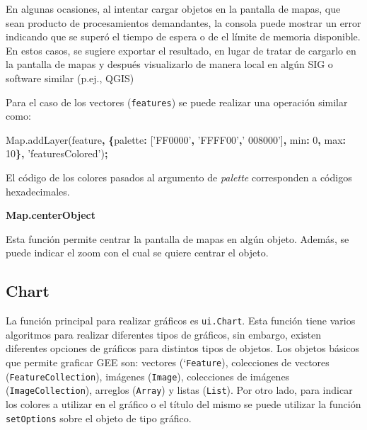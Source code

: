 \documentclass[
]{article}
\newenvironment{Shaded}{\begin{snugshade}}{\end{snugshade}}
\newcommand{\AttributeTok}[1]{\textcolor[rgb]{0.77,0.63,0.00}{#1}}
\newcommand{\DataTypeTok}[1]{\textcolor[rgb]{0.13,0.29,0.53}{#1}}
\newcommand{\DecValTok}[1]{\textcolor[rgb]{0.00,0.00,0.81}{#1}}
\newcommand{\NormalTok}[1]{#1}
\newcommand{\OperatorTok}[1]{\textcolor[rgb]{0.81,0.36,0.00}{\textbf{#1}}}
\newcommand{\StringTok}[1]{\textcolor[rgb]{0.31,0.60,0.02}{#1}}
\newcommand{\VariableTok}[1]{\textcolor[rgb]{0.00,0.00,0.00}{#1}}
\begin{document}
\begin{tipblock}
En algunas ocasiones, al intentar cargar objetos en la pantalla de
mapas, que sean producto de procesamientos demandantes, la consola puede
mostrar un error indicando que se superó el tiempo de espera o de el
límite de memoria disponible. En estos casos, se sugiere exportar el
resultado, en lugar de tratar de cargarlo en la pantalla de mapas y
después visualizarlo de manera local en algún SIG o software similar
(p.ej., QGIS)

\end{tipblock}

Para el caso de los vectores (\texttt{features}) se puede realizar una
operación similar como:

\begin{Shaded}
\begin{Highlighting}[]
\VariableTok{Map}\NormalTok{.}\AttributeTok{addLayer}\NormalTok{(feature}\OperatorTok{,} \OperatorTok{\{}\DataTypeTok{palette}\OperatorTok{:}\NormalTok{ [}\StringTok{'FF0000'}\OperatorTok{,} \StringTok{'FFFF00'}\OperatorTok{,}\StringTok{' 008000'}\NormalTok{]}\OperatorTok{,} \DataTypeTok{min}\OperatorTok{:} \DecValTok{0}\OperatorTok{,} \DataTypeTok{max}\OperatorTok{:} \DecValTok{10}\OperatorTok{\},}
\StringTok{'featuresColored'}\NormalTok{)}\OperatorTok{;}
\end{Highlighting}
\end{Shaded}

\begin{tipblock}
El código de los colores pasados al argumento de \emph{palette}
corresponden a códigos hexadecimales.

\end{tipblock}

\textbf{Map.centerObject}

Esta función permite centrar la pantalla de mapas en algún objeto.
Además, se puede indicar el zoom con el cual se quiere centrar el
objeto.

\hypertarget{chart}{%
\subsection{Chart}\label{chart}}

La función principal para realizar gráficos es \texttt{ui.Chart}. Esta
función tiene varios algoritmos para realizar diferentes tipos de
gráficos, sin embargo, existen diferentes opciones de gráficos para
distintos tipos de objetos. Los objetos básicos que permite graficar GEE
son: vectores (`\texttt{Feature}), colecciones de vectores
(\texttt{FeatureCollection}), imágenes (\texttt{Image}), colecciones de
imágenes (\texttt{ImageCollection}), arreglos (\texttt{Array}) y listas
(\texttt{List}). Por otro lado, para indicar los colores a utilizar en
el gráfico o el título del mismo se puede utilizar la función
\texttt{setOptions} sobre el objeto de tipo gráfico.
\end{document}
